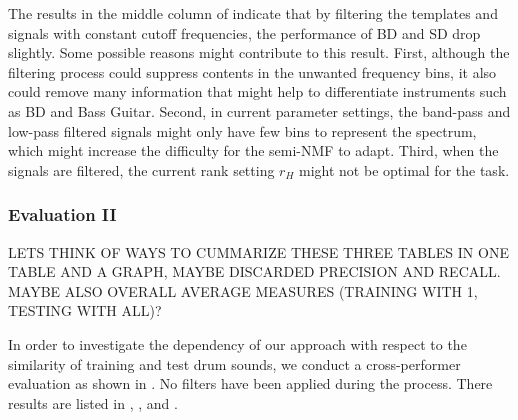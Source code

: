 \documentclass{article}
\begin{document}
The results in the middle column of  indicate that by filtering the templates and signals with constant cutoff frequencies, the performance of BD and SD drop slightly.	Some possible reasons might contribute to this result. First, although the filtering process could suppress contents in the unwanted frequency bins, it also could remove many information that might help to differentiate instruments such as BD and Bass Guitar. Second, in current parameter settings, the band-pass and low-pass filtered signals might only have few bins to represent the spectrum, which might increase the difficulty for the semi-NMF to adapt. Third, when the signals are filtered, the current rank setting $r_H$ might not be optimal for the task.  

%
%
%


\subsubsection{Evaluation II}
LETS THINK OF WAYS TO CUMMARIZE THESE THREE TABLES IN ONE TABLE AND A GRAPH, MAYBE DISCARDED PRECISION AND RECALL. MAYBE ALSO OVERALL AVERAGE MEASURES (TRAINING WITH 1, TESTING WITH ALL)?

In order to investigate the dependency of our approach with respect to the similarity of training and test drum sounds, we conduct a cross-performer evaluation as shown in . No filters have been applied during the process. There results are listed in , , and .
\end{document}
